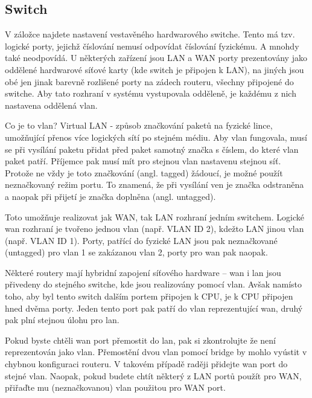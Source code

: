\subsection{Switch}
\label{net:switch}
V záložce  najdete nastavení vestavěného
hardwarového switche. Tento má tzv. logické porty, jejichž číslování nemusí
odpovídat číslování fyzickému. A mnohdy také neodpovídá. U některých zařízení
jsou LAN a WAN porty prezentovány jako oddělené hardwarové síťové karty
(kde switch je připojen k LAN), na jiných jsou obé jen jinak barevně rozlišené
porty na zádech routeru, všechny připojené do switche. Aby tato rozhraní v
systému vystupovala odděleně, je každému z nich nastavena oddělená \gls{vlan}.


Co je to \gls{vlan}? Virtual LAN - způsob značkování
paketů na fyzické lince, umožňující přenos více logických sítí po stejném
médiu. Aby \gls{vlan} fungovala, musí se při vysílání paketu přidat před
paket samotný značka s číslem, do které \gls{vlan} paket patří. Příjemce
pak musí mít pro stejnou \gls{vlan} nastavenu stejnou síť. Protože ne vždy
je toto značkování (angl. tagged) žádoucí, je možné použít neznačkovaný režim
portu. To znamená, že při vysílání ven je značka odstraněna a naopak při
přijetí je značka doplněna (angl. untagged).

Toto umožňuje realizovat jak WAN, tak LAN rozhraní jedním switchem. Logické
\gls{wan} rozhraní je tvořeno jednou \gls{vlan} (např. VLAN ID 2), kdežto
LAN jinou \gls{vlan} (např. VLAN ID 1). Porty, patřící do fyzické LAN jsou
pak neznačkované (untagged) pro \gls{vlan} 1 se zakázanou \gls{vlan} 2, porty
pro \gls{wan} pak naopak.

Některé routery mají hybridní zapojení síťového hardware -- \gls{wan} i
\gls{lan} jsou přivedeny do stejného switche, kde jsou realizovány pomocí \gls{vlan}.
Avšak namísto toho, aby byl tento switch dalším portem připojen k CPU, je k CPU
připojen hned dvěma porty. Jeden tento port pak patří do \gls{vlan} reprezentující
\gls{wan}, druhý pak plní stejnou úlohu pro \gls{lan}.

Pokud byste chtěli \gls{wan} port přemostit do \gls{lan}, pak si zkontrolujte
že není reprezentován jako \gls{vlan}. Přemostění dvou vlan pomocí bridge
by mohlo vyústit v chybnou konfiguraci routeru. V takovém případě raději přidejte
\gls{wan} port do stejné \gls{vlan}. Naopak, pokud budete chtít některý z LAN
portů použít pro WAN, přiřaďte mu (neznačkovanou) \gls{vlan} použitou pro WAN
port.


